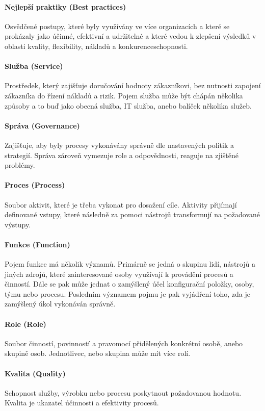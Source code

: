 \documentclass[
  digital,     %
  twoside,     %
  lof,         %
  lot,         %
]{fithesis4}
\begin{document}
\paragraph{Nejlepší praktiky (Best practices)}
Osvědčené postupy, které byly využívány ve více organizacích a které se prokázaly jako účinné, efektivní a udržitelné a které vedou k zlepšení výsledků v oblasti kvality, flexibility, nákladů a konkurenceschopnosti.
\paragraph{Služba (Service)}
Prostředek, který zajišťuje doručování hodnoty zákazníkovi, bez nutnosti zapojení zákazníka do řízení nákladů a rizik. Pojem služba může být chápán několika způsoby a to buď jako obecná služba, IT služba, anebo balíček několika služeb. 
\paragraph{Správa (Governance)}
Zajišťuje, aby byly procesy vykonávány správně dle nastavených politik a strategií. Správa zároveň vymezuje role a odpovědnosti, reaguje na zjištěné problémy.
\paragraph{Proces (Process)}
Soubor aktivit, které je třeba vykonat pro dosažení cíle. Aktivity přijímají definované vstupy, které následně za pomoci nástrojů transformují na požadované výstupy.
\paragraph{Funkce (Function)}
Pojem funkce má několik významů. Primárně se jedná o skupinu lidí, nástrojů a jiných zdrojů, které zainteresované osoby využívají k provádění procesů a činností. Dále se pak může jednat o zamýšlený účel konfigurační položky, osoby, týmu nebo procesu. Posledním významem pojmu je pak vyjádření toho, zda je zamýšlený úkol vykonáván správně. 
\paragraph{Role (Role)}
Soubor činností, povinností a pravomocí přidělených konkrétní osobě, anebo skupině osob. Jednotlivec, nebo skupina může mít více rolí.
\paragraph{Kvalita (Quality)}
Schopnost služby, výrobku nebo procesu poskytnout požadovanou hodnotu. Kvalita je ukazatel účinnosti a efektivity procesů.
\end{document}
